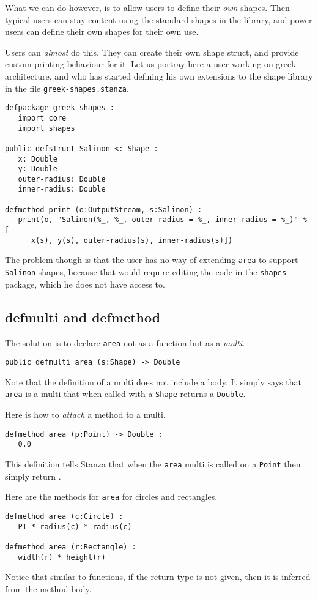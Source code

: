 \documentclass[10pt,oneside]{book}
\begin{document}
What we can do however, is to allow users to define their {\em own} shapes. Then typical users can stay content using the standard shapes in the library, and power users can define their own shapes for their own use. 

Users can {\em almost} do this. They can create their own shape struct, and provide custom printing behaviour for it. Let us portray here a user working on greek architecture, and who has started defining his own extensions to the shape library in the file \texttt{\frenchspacing greek-shapes.stanza}.
\begin{lstlisting}
defpackage greek-shapes :
   import core
   import shapes

public defstruct Salinon <: Shape :
   x: Double
   y: Double
   outer-radius: Double
   inner-radius: Double

defmethod print (o:OutputStream, s:Salinon) :
   print(o, "Salinon(%_, %_, outer-radius = %_, inner-radius = %_)" % [
      x(s), y(s), outer-radius(s), inner-radius(s)])
\end{lstlisting}
The problem though is that the user has no way of extending \texttt{\frenchspacing area} to support \texttt{\frenchspacing Salinon} shapes, because that would require editing the code in the \texttt{\frenchspacing shapes} package, which he does not have access to.

\subsection*{defmulti and defmethod}
The solution is to declare \texttt{\frenchspacing area} not as a function but as a {\em multi}.
\begin{lstlisting}
public defmulti area (s:Shape) -> Double
\end{lstlisting}
Note that the definition of a multi does not include a body. It simply says that \texttt{\frenchspacing area} is a multi that when called with a \texttt{\frenchspacing Shape} returns a \texttt{\frenchspacing Double}. 

Here is how to {\em attach} a method to a multi.
\begin{lstlisting}
defmethod area (p:Point) -> Double :
   0.0
\end{lstlisting}
This definition tells Stanza that when the \texttt{\frenchspacing area} multi is called on a \texttt{\frenchspacing Point} then simply return \texttt{}. 

Here are the methods for \texttt{\frenchspacing area} for circles and rectangles.
\begin{lstlisting}
defmethod area (c:Circle) :
   PI * radius(c) * radius(c)

defmethod area (r:Rectangle) :
   width(r) * height(r)
\end{lstlisting}
Notice that similar to functions, if the return type is not given, then it is inferred from the method body. 
\end{document}
